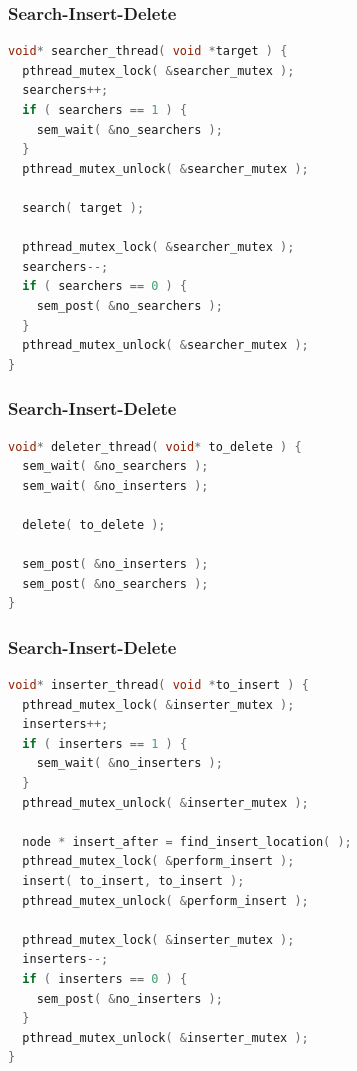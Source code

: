 \begin{frame}[fragile]
	\frametitle{Search-Insert-Delete}
	\begin{lstlisting}[language=C]
void* searcher_thread( void *target ) {
  pthread_mutex_lock( &searcher_mutex );
  searchers++;
  if ( searchers == 1 ) {
    sem_wait( &no_searchers );
  }
  pthread_mutex_unlock( &searcher_mutex );
  
  search( target );
  
  pthread_mutex_lock( &searcher_mutex );
  searchers--;
  if ( searchers == 0 ) {
    sem_post( &no_searchers );
  }
  pthread_mutex_unlock( &searcher_mutex );
}
\end{lstlisting}
\end{frame}

\begin{frame}[fragile]
	\frametitle{Search-Insert-Delete}
	\begin{lstlisting}[language=C]
void* deleter_thread( void* to_delete ) {
  sem_wait( &no_searchers );
  sem_wait( &no_inserters );
  
  delete( to_delete );
  
  sem_post( &no_inserters );
  sem_post( &no_searchers );
}
\end{lstlisting}
\end{frame}

\begin{frame}[fragile]
	\frametitle{Search-Insert-Delete}
	\begin{lstlisting}[language=C]
void* inserter_thread( void *to_insert ) {
  pthread_mutex_lock( &inserter_mutex );
  inserters++;
  if ( inserters == 1 ) {
    sem_wait( &no_inserters );
  }
  pthread_mutex_unlock( &inserter_mutex );
  
  node * insert_after = find_insert_location( );
  pthread_mutex_lock( &perform_insert );
  insert( to_insert, to_insert );
  pthread_mutex_unlock( &perform_insert );
  
  pthread_mutex_lock( &inserter_mutex );
  inserters--;
  if ( inserters == 0 ) {
    sem_post( &no_inserters );
  }
  pthread_mutex_unlock( &inserter_mutex );
}
\end{lstlisting}
\end{frame}



